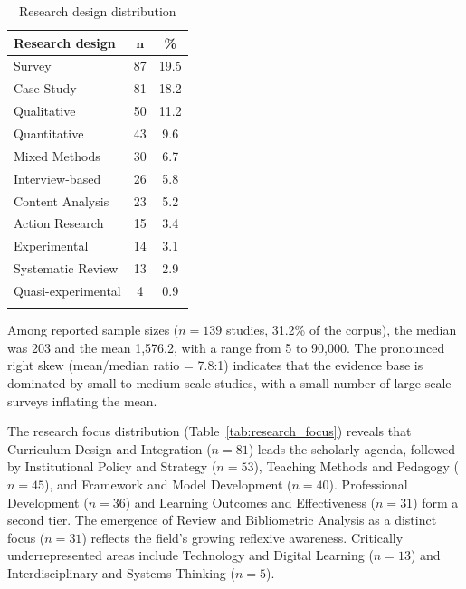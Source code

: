 \documentclass[pdflatex,sn-basic]{sn-jnl}%
\begin{document}
\begin{table}[htbp]
\centering
\caption{Research design distribution}\label{tab:research_design}
\begin{tabular}{l c c}
\toprule
\textbf{Research design} & $\boldsymbol{n}$ & \textbf{\%} \\
\midrule
Survey & 87 & 19.5 \\
Case Study & 81 & 18.2 \\
Qualitative & 50 & 11.2 \\
Quantitative & 43 & 9.6 \\
Mixed Methods & 30 & 6.7 \\
Interview-based & 26 & 5.8 \\
Content Analysis & 23 & 5.2 \\
Action Research & 15 & 3.4 \\
Experimental & 14 & 3.1 \\
Systematic Review & 13 & 2.9 \\
Quasi-experimental & 4 & 0.9 \\
\botrule
\end{tabular}
\end{table}

Among reported sample sizes ($n = 139$ studies, 31.2\% of the corpus), the median was 203 and the mean 1,576.2, with a range from 5 to 90,000. The pronounced right skew (mean/median ratio = 7.8:1) indicates that the evidence base is dominated by small-to-medium-scale studies, with a small number of large-scale surveys inflating the mean.

The research focus distribution (Table~\ref{tab:research_focus}) reveals that Curriculum Design and Integration ($n = 81$) leads the scholarly agenda, followed by Institutional Policy and Strategy ($n = 53$), Teaching Methods and Pedagogy ($n = 45$), and Framework and Model Development ($n = 40$). Professional Development ($n = 36$) and Learning Outcomes and Effectiveness ($n = 31$) form a second tier. The emergence of Review and Bibliometric Analysis as a distinct focus ($n = 31$) reflects the field's growing reflexive awareness. Critically underrepresented areas include Technology and Digital Learning ($n = 13$) and Interdisciplinary and Systems Thinking ($n = 5$).
\end{document}
